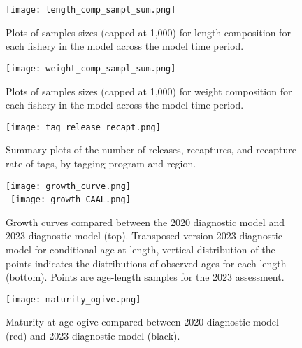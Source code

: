 \newpage
\begin{landscape}
  \begin{figure}[!ht]
    \centering
    \texttt{[image: length\_comp\_sampl\_sum.png]}
    \caption{Plots of samples sizes (capped at 1,000) for length composition for each fishery in the model across the model time period. \label{fig:length_comp_sampl_sum}}
  \end{figure}
\end{landscape}
\clearpage

\newpage
\begin{landscape}
  \begin{figure}[!ht]
    \centering
    \texttt{[image: weight\_comp\_sampl\_sum.png]}
    \caption{Plots of samples sizes (capped at 1,000) for weight composition for each fishery in the model across the model time period. \label{fig:size_comp_sampl_sum}}
  \end{figure}
\end{landscape}
\clearpage

\newpage
\begin{landscape}
  \begin{figure}[!ht]
    \centering
    \texttt{[image: tag\_release\_recapt.png]}
    \caption{Summary plots of the number of releases, recaptures, and recapture rate of tags, by tagging program and region. \label{fig:tag_release_recapt}}
  \end{figure}
\end{landscape}
\clearpage

\newpage
\begin{figure}[!ht]
  \centering
  \texttt{[image: growth\_curve.png]}\\
  ~\hspace{14mm}\texttt{[image: growth\_CAAL.png]}
  \caption{Growth curves compared between the 2020 diagnostic model and 2023 diagnostic model (top). Transposed version 2023 diagnostic model for conditional-age-at-length, vertical distribution of the points indicates the distributions of observed ages for each length (bottom). Points are age-length samples for the 2023 assessment. \label{fig:growth_curve}}
\end{figure}
\clearpage

\newpage
\begin{figure}[!ht]
  \centering
  \texttt{[image: maturity\_ogive.png]}
  \caption{Maturity-at-age ogive compared between 2020 diagnostic model (red) and 2023 diagnostic model (black). \label{fig:maturity_ogive}}
\end{figure}
\clearpage

